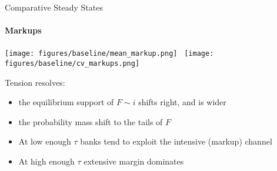 \documentclass[10pt,english,slidetop,compress,
              blue,mathserif,color=option]{beamer}
\theoremstyle{plain}
\theoremstyle{definition}
\begin{document}
\begin{frame}{Comparative Steady States}
  \framesubtitle{Markups}
  \begin{center}
    \texttt{[image: figures/baseline/mean\_markup.png]}
    \
    \texttt{[image: figures/baseline/cv\_markups.png]}
  \end{center}
  Tension resolves:
  \begin{itemize}
    \item the equilibrium support of $F \sim i$ shifts right, and is wider

    \item the probability mass shift to the tails of $F$
  \end{itemize}

    \bigskip

  \begin{itemize}
    \item At low enough $\tau$ banks tend to exploit the intensive (markup) channel

    \item At high enough $\tau$ extensive margin dominates
  \end{itemize}
\end{frame}
\end{document}
